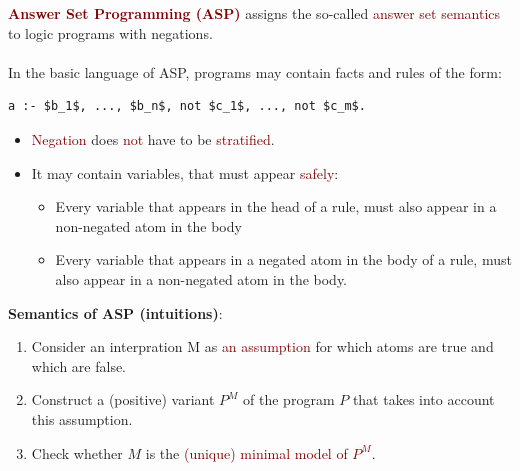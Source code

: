 \textbf{\textcolor{Maroon}{Answer Set Programming (ASP)}} assigns the so-called \textcolor{Maroon}{answer set semantics} to logic programs with negations. \\
\\
In the basic language of ASP, programs may contain facts and rules of the form:
\begin{lstlisting}
a :- $b_1$, ..., $b_n$, not $c_1$, ..., not $c_m$.
\end{lstlisting}
\begin{itemize}
    \item \textcolor{Maroon}{Negation} does \textcolor{Maroon}{not} have to be \textcolor{Maroon}{stratified}.
    \item It may contain variables, that must appear \textcolor{Maroon}{safely}:
    \begin{itemize}
        \item Every variable that appears in the head of a rule, must also appear in a non-negated atom in the body
        \item Every variable that appears in a negated atom in the body of a rule, must also appear in a non-negated atom in the body.
    \end{itemize}
\end{itemize}

\textbf{Semantics of ASP (intuitions)}:
\begin{enumerate}
    \setlength\itemsep{-0.5em}
    \item Consider an \textcolor{NavyBlue}{interpration M} as \textcolor{Maroon}{an assumption} for which atoms are true and which are false.
    \item Construct a (positive) \textcolor{NavyBlue}{variant $P^M$} of the program $P$ that takes into account this assumption.
    \item Check whether $M$ is the \textcolor{Maroon}{(unique) minimal model of $P^M$}.
\end{enumerate}


